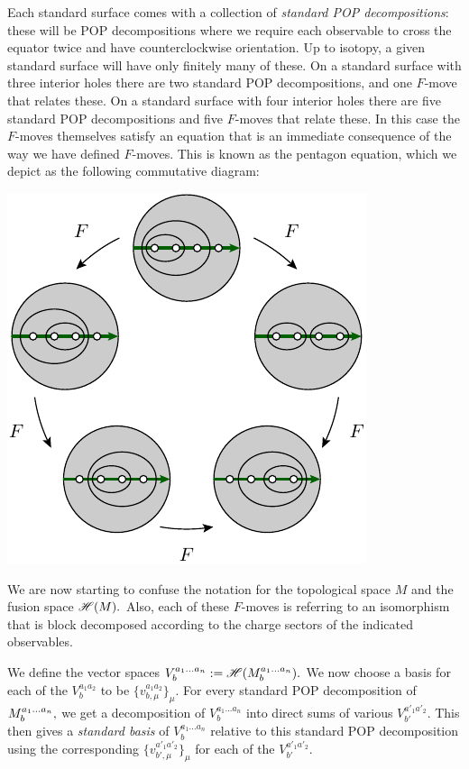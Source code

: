 Each standard surface comes with a collection of
\emph{standard POP decompositions}:
these will be POP decompositions where we require each
observable to cross the
equator twice and have counterclockwise orientation.
Up to isotopy, a given standard surface will have only finitely many of these.
On a standard surface with three
interior holes there are two standard POP decompositions,
and one $F$-move that relates these.
On a standard surface with four interior holes there are five 
standard POP decompositions and five $F$-moves that relate these.
In this case the $F$-moves themselves satisfy an equation
that is an immediate consequence of the way we have defined $F$-moves.
This is known as the pentagon equation, which we depict as
the following commutative diagram:
\begin{center}
\includegraphics[]{pic-pentagon.pdf}
\end{center}
We are now starting to confuse the notation 
for the topological space $M$ and the fusion space $\mathscr{H}(M).$
Also, each of these $F$-moves is referring to an isomorphism 
that is block decomposed according to the charge sectors 
of the indicated observables.

We define the vector spaces 
$ V^{a_1...a_n}_{b} := \mathscr{H}(M^{a_1...a_n}_{b}).$ 
We now choose a basis for each of the
$V^{a_1a_2}_{b}$ to be $\{v^{a_1a_2}_{b,\mu}\}_{\mu}.$
For every standard POP decomposition of $M^{a_1...a_n}_{b},$
we get a decomposition of 
$V^{a_1...a_n}_{b}$ into direct sums of various %
$V^{a'_1a'_2}_{b'}.$ 
This then gives a \emph{standard basis} of $V^{a_1...a_n}_{b}$
relative to this standard POP decomposition
using the corresponding  $\{v^{a'_1a'_2}_{b',\mu}\}_{\mu}$
for each of the $V^{a'_1a'_2}_{b'}.$ %

